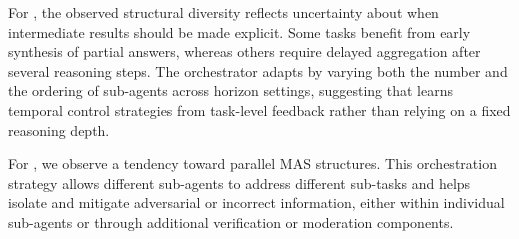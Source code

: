 For \horizon, the observed structural diversity reflects uncertainty about when intermediate results should be made explicit. Some tasks benefit from early synthesis of partial answers, whereas others require delayed aggregation after several reasoning steps. The orchestrator adapts by varying both the number and the ordering of sub-agents across horizon settings, suggesting that \ourframework learns temporal control strategies from task-level feedback rather than relying on a fixed reasoning depth.

For \robustness, we observe a tendency toward parallel MAS structures. This orchestration strategy allows different sub-agents to address different sub-tasks and helps isolate and mitigate adversarial or incorrect information, either within individual sub-agents or through additional verification or moderation components.







